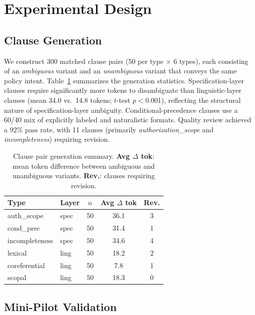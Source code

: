 \documentclass[11pt,a4paper]{article}
\begin{document}
\section{Experimental Design}
\label{sec:method}

\subsection{Clause Generation}
\label{sec:clause_gen}

We construct 300 matched clause pairs (50 per type $\times$ 6 types), each consisting of an \emph{ambiguous} variant and an \emph{unambiguous} variant that conveys the same policy intent.
Table~\ref{tab:clause_gen} summarizes the generation statistics.
Specification-layer clauses require significantly more tokens to disambiguate than linguistic-layer clauses (mean 34.0 vs.\ 14.8 tokens; $t$-test $p<$0.001), reflecting the structural nature of specification-layer ambiguity.
Conditional-precedence clauses use a 60/40 mix of explicitly labeled and naturalistic formats.
Quality review achieved a 92\% pass rate, with 11 clauses (primarily \emph{authorization\_scope} and \emph{incompleteness}) requiring revision.

\begin{table}[t]
\centering
\small
\begin{tabular}{llccc}
\toprule
\textbf{Type} & \textbf{Layer} & \textbf{$n$} & \textbf{Avg $\Delta$ tok} & \textbf{Rev.} \\
\midrule
auth\_scope & spec & 50 & 36.1 & 3 \\
cond\_prec & spec & 50 & 31.4 & 1 \\
incompleteness & spec & 50 & 34.6 & 4 \\
lexical & ling & 50 & 18.2 & 2 \\
coreferential & ling & 50 & 7.8 & 1 \\
scopal & ling & 50 & 18.3 & 0 \\
\bottomrule
\end{tabular}
\caption{Clause pair generation summary. \textbf{Avg $\Delta$ tok}: mean token difference between ambiguous and unambiguous variants. \textbf{Rev.}: clauses requiring revision.}
\label{tab:clause_gen}
\end{table}

\subsection{Mini-Pilot Validation}
\end{document}
